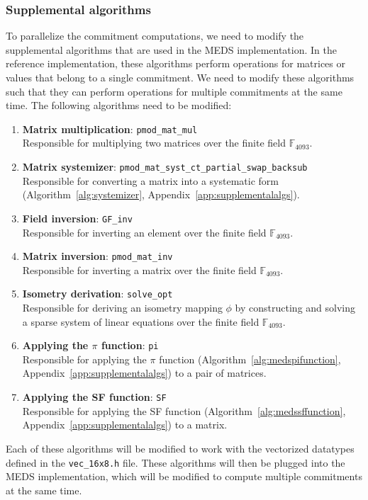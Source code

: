 \documentclass[11pt,a4paper]{report}
\theoremstyle{definition}
\begin{document}
\subsubsection{Supplemental algorithms}
\label{sec:suppalgorithmsparallelization}
To parallelize the commitment computations, we need to modify the supplemental algorithms that are used in the MEDS implementation. In the reference implementation, these algorithms perform operations for matrices or values that belong to a single commitment. We need to modify these algorithms such that they can perform operations for multiple commitments at the same time. The following algorithms need to be modified:
\begin{enumerate}
  \item \textbf{Matrix multiplication}: \texttt{pmod\_mat\_mul}\\
        Responsible for multiplying two matrices over the finite field $\mathbb{F}_{4093}$.
  \item \textbf{Matrix systemizer}: \texttt{pmod\_mat\_syst\_ct\_partial\_swap\_backsub}\\
        Responsible for converting a matrix into a systematic form (Algorithm~\ref{alg:systemizer}, Appendix~\ref{app:supplementalalgs}).
  \item \textbf{Field inversion}: \texttt{GF\_inv}\\
        Responsible for inverting an element over the finite field $\mathbb{F}_{4093}$.
  \item \textbf{Matrix inversion}: \texttt{pmod\_mat\_inv}\\
        Responsible for inverting a matrix over the finite field $\mathbb{F}_{4093}$.
  \item \textbf{Isometry derivation}: \texttt{solve\_opt}\\
        Responsible for deriving an isometry mapping $\phi$ by constructing and solving a sparse system of linear equations over the finite field $\mathbb{F}_{4093}$.
  \item \textbf{Applying the $\pi$ function}: \texttt{pi}\\
        Responsible for applying the $\pi$ function (Algorithm~\ref{alg:medspifunction}, Appendix~\ref{app:supplementalalgs}) to a pair of matrices.
  \item \textbf{Applying the SF function}: \texttt{SF}\\
        Responsible for applying the SF function (Algorithm~\ref{alg:medssffunction}, Appendix~\ref{app:supplementalalgs}) to a matrix.
\end{enumerate}
Each of these algorithms will be modified to work with the vectorized datatypes defined in the \texttt{vec\_16x8.h} file. These algorithms will then be plugged into the MEDS implementation, which will be modified to compute multiple commitments at the same time.
\end{document}
